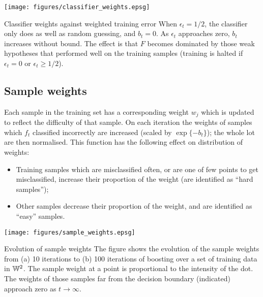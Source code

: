 \begin{linefigure}
\begin{center}
\texttt{[image: figures/classifier\_weights.epsg]}
\end{center}
\begin{capt}{Classifier weights against weighted training error}
When $\epsilon_t = 1/2$, the classifier only does as well as random
guessing, and $b_t = 0$.  As $\epsilon_t$ approaches zero, $b_t$
increases without bound.  The effect is that $F$ becomes dominated by
those weak hypotheses that performed well on the training samples
(training is halted if $\epsilon_t = 0$ or $\epsilon_t \geq
1/2$).
\end{capt}
\end{linefigure}


\subsection{Sample weights}
\label{sec:sample weights}

Each sample in the training set has a corresponding weight $w_j$ which
is updated to reflect the difficulty of that sample.  On each iteration the
weights of samples which $f_t$ classified incorrectly are increased
(scaled by $\exp \{ -b_t \}$); the whole lot are then normalised.
This function has the following effect on distribution of weights:

\begin{itemize}

\item	Training samples which are misclassified often, or are one of 
	few points to get misclassified, increase their proportion of
	the weight (are identified as ``hard samples'');

\item	Other samples decrease their proportion of the weight, and are
	identified as ``easy'' samples.

\end{itemize}

\begin{linefigure}
\begin{center}
\texttt{[image: figures/sample\_weights.epsg]}
\end{center}
\begin{capt}{Evolution of sample weights}
The figure shows the evolution of the sample weights from (a) 10
iterations to (b) 100 iterations of boosting over a set of training
data in $\mathbb{W}^2$.  The sample weight at a point is proportional to the
intensity of the dot.  The weights of those samples far from the
decision boundary (indicated) approach zero as $t \rightarrow \infty$.
\end{capt}
\end{linefigure}

